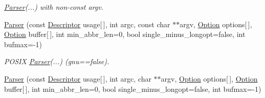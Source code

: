 \begin{DoxyCompactItemize}
\begin{DoxyCompactList}\small\item\em \hyperlink{classxmem_1_1config_1_1third__party_1_1_parser}{Parser}(...) with non-\/const argv. \end{DoxyCompactList}\item 
\hypertarget{classxmem_1_1config_1_1third__party_1_1_parser_a3d0990e00bad445fb5753ace6283d497}{\hyperlink{classxmem_1_1config_1_1third__party_1_1_parser_a3d0990e00bad445fb5753ace6283d497}{Parser} (const \hyperlink{structxmem_1_1config_1_1third__party_1_1_descriptor}{Descriptor} usage\mbox{[}$\,$\mbox{]}, int argc, const char $\ast$$\ast$argv, \hyperlink{classxmem_1_1config_1_1third__party_1_1_option}{Option} options\mbox{[}$\,$\mbox{]}, \hyperlink{classxmem_1_1config_1_1third__party_1_1_option}{Option} buffer\mbox{[}$\,$\mbox{]}, int min\-\_\-abbr\-\_\-len=0, bool single\-\_\-minus\-\_\-longopt=false, int bufmax=-\/1)}\label{classxmem_1_1config_1_1third__party_1_1_parser_a3d0990e00bad445fb5753ace6283d497}

\begin{DoxyCompactList}\small\item\em P\-O\-S\-I\-X \hyperlink{classxmem_1_1config_1_1third__party_1_1_parser}{Parser}(...) (gnu==false). \end{DoxyCompactList}\item 
\hypertarget{classxmem_1_1config_1_1third__party_1_1_parser_ad3d40c69fbb64462daf43b84334cb28b}{\hyperlink{classxmem_1_1config_1_1third__party_1_1_parser_ad3d40c69fbb64462daf43b84334cb28b}{Parser} (const \hyperlink{structxmem_1_1config_1_1third__party_1_1_descriptor}{Descriptor} usage\mbox{[}$\,$\mbox{]}, int argc, char $\ast$$\ast$argv, \hyperlink{classxmem_1_1config_1_1third__party_1_1_option}{Option} options\mbox{[}$\,$\mbox{]}, \hyperlink{classxmem_1_1config_1_1third__party_1_1_option}{Option} buffer\mbox{[}$\,$\mbox{]}, int min\-\_\-abbr\-\_\-len=0, bool single\-\_\-minus\-\_\-longopt=false, int bufmax=-\/1)}\label{classxmem_1_1config_1_1third__party_1_1_parser_ad3d40c69fbb64462daf43b84334cb28b}


\end{DoxyCompactItemize}
